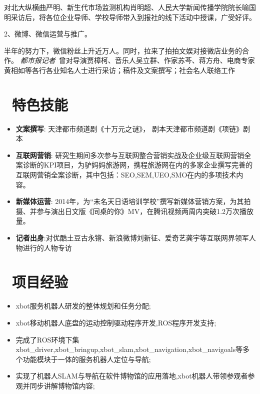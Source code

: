 \documentclass{resume}
\begin{document}
对北大纵横曲严明、新生代市场监测机构肖明超、人民大学新闻传播学院院长喻国明采访后，将各位企业导师、学校导师带入到报社的线下活动中授课，广受好评。

2、微博、微信运营与推广。

半年的努力下，微信粉丝上升近万人。同时，拉来了拍拍文娱对接微店业务的合作。
\textit{都市报记者}\ 曾对导演贾樟柯、音乐人吴立群、作家苏芩、蒋方舟、电商专家黄相如等各行各业知名人士进行采访；稿件及文案撰写；社会名人联络工作
\section{\faCogs\  特色技能}
\begin{itemize}[parsep=0.5ex]
  \item \textbf{文案撰写}: 天津都市频道剧《十万元之谜》， 剧本天津都市频道剧《项链》剧本
  \item \textbf{互联网营销}: 研究生期间多次参与互联网整合营销实战及企业级互联网营销全案诊断的KPI项目，为驴妈妈旅游网，携程旅游网在内的多家企业撰写完善的互联网营销全案诊断，其中包括：SEO,SEM,UEO,SMO在内的多项技术内容。
  \item \textbf{新媒体运营}: 2014年，为“未名天日语培训学校”撰写新媒体营销方案，为其拍摄、并参与演出日文版《同桌的你》MV，在腾讯视频两周内突破1.2万次播放量。
  \item \textbf{记者出身}:对优酷土豆古永锵、新浪微博刘新征、爱奇艺龚宇等互联网界领军人物进行的人物专访
\end{itemize}

\section{\faUsers\ 项目经验}

\begin{itemize}
  \item xbot服务机器人研发的整体规划和任务分配;
  \item xbot移动机器人底盘的运动控制驱动程序开发,ROS程序开发支持;
  \item 完成了ROS环境下集xbot\_driver,xbot\_bringup,xbot\_slam,xbot\_navigation,xbot\_navigoals等多个功能模块于一体的服务机器人定位与导航;
  \item 实现了机器人SLAM与导航在软件博物馆的应用落地,xbot机器人带领参观者参观并同步讲解博物馆内容;
\end{itemize}
\end{document}

